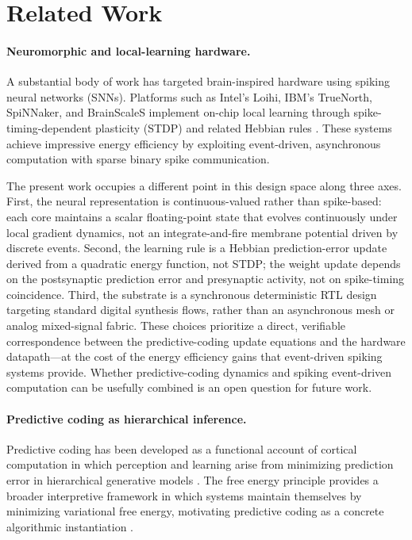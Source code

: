 \documentclass{article}
\begin{document}
\section{Related Work}
\label{sec:related}

\paragraph{Neuromorphic and local-learning hardware.}
A substantial body of work has targeted brain-inspired hardware using spiking neural networks (SNNs).
Platforms such as Intel's Loihi, IBM's TrueNorth, SpiNNaker, and BrainScaleS implement on-chip local
learning through spike-timing-dependent plasticity (STDP) and related Hebbian rules
\cite{davies2018loihi,furber2014spinnaker,schmitt2017neuromorphic}.
These systems achieve impressive energy efficiency by exploiting event-driven, asynchronous computation
with sparse binary spike communication.

The present work occupies a different point in this design space along three axes.
First, the neural representation is continuous-valued rather than spike-based: each core maintains a
scalar floating-point state that evolves continuously under local gradient dynamics, not an
integrate-and-fire membrane potential driven by discrete events.
Second, the learning rule is a Hebbian prediction-error update derived from a quadratic energy
function, not STDP; the weight update depends on the postsynaptic prediction error and presynaptic
activity, not on spike-timing coincidence.
Third, the substrate is a synchronous deterministic RTL design targeting standard digital synthesis
flows, rather than an asynchronous mesh or analog mixed-signal fabric.
These choices prioritize a direct, verifiable correspondence between the predictive-coding update
equations and the hardware datapath---at the cost of the energy efficiency gains that event-driven
spiking systems provide.
Whether predictive-coding dynamics and spiking event-driven computation can be usefully combined
is an open question for future work.

\paragraph{Predictive coding as hierarchical inference.}
Predictive coding has been developed as a functional account of cortical computation in which perception and learning arise from minimizing prediction error in hierarchical generative models \cite{rao1999predictive, friston2005theory}. The free energy principle provides a broader interpretive framework in which systems maintain themselves by minimizing variational free energy, motivating predictive coding as a concrete algorithmic instantiation \cite{friston2009free}.
\end{document}
